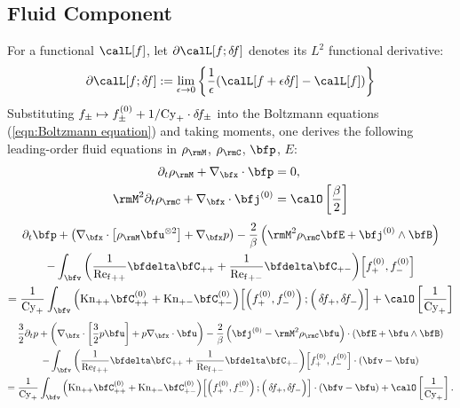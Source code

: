     \line

    \subsection*{Fluid Component}
        For a functional $\calL[f]$, let $\partial\calL[f; \delta\!f]$ denotes its $L^{2}$ functional derivative:
        \begin{equation}
            \partial\calL[f; \delta\!f]  :=  \lim_{\epsilon \rightarrow 0}\left\{\frac{1}{\epsilon}(\calL[f + \epsilon\delta\!f] - \calL[f])\right\}
        \end{equation}
        Substituting $f_{\pm}  \mapsto  f_{\pm}^{(0)} + 1/\mathrm{Cy}_{+}\cdot\delta\!f_{\pm}$ into the Boltzmann equations (\ref{eqn:Boltzmann equation}) and taking moments, one derives the following leading-order fluid equations in $\rho_{\rmM}$, $\rho_{\rmC}$, $\bfp$, $E$:
        \begin{align}
            \partial_{t}\rho_{\rmM} + \nabla_{\bfx}\cdot\bfp  &=  0,  \label{eqn:PiC-coupled mass conservation}  \\
            \rmM^{2}\partial_{t}\rho_{\rmC} + \nabla_{\bfx}\cdot\bfj^{(0)}  &=  \calO\left[\frac{\beta}{2}\right]  \label{eqn:PiC-coupled charge conservation}
        \end{align}
        \vspace{-20pt}
        \begin{multline}
            \partial_{t}\bfp + \left(\nabla_{\bfx}\cdot\left[\rho_{\rmM}\bfu^{\otimes 2}\right] + \nabla_{\bfx}p\right) - \frac{2}{\beta}\left(\rmM^{2}\rho_{\rmC}\bfE + \bfj^{(0)}\wedge\bfB\right) \\
            - \int_{\bfv}\left(\frac{1}{{\rmRef}_{++}}\bfdelta\bfC_{++} + \frac{1}{{\rmRef}_{+-}}\bfdelta\bfC_{+-}\right)\!\left[f_{+}^{(0)}, f_{-}^{(0)}\right]  \\
            =  \frac{1}{\rmCy_{+}}\int_{\bfv}\left(\rmKn_{++}\bfC_{++}^{(0)} + \rmKn_{+-}\bfC_{+-}^{(0)}\right)\!\left[\left(f_{+}^{(0)}, f_{-}^{(0)}\right); \left({\color{white} f_{+}^{(0)}}\!\!\!\!\!\!\!\!\!\delta\!f_{+}, \delta\!f_{-}\right)\right] + \calO\left[\frac{1}{\rmCy_{+}}\right]
        \end{multline}
        \vspace{-20pt}
        \begin{multline}\label{eqn:PiC-coupled pressure conservation}
            \frac{3}{2}\partial_{t}p + \left(\nabla_{\bfx}\cdot\left[\frac{3}{2}p\bfu\right] + p\nabla_{\bfx}\cdot\bfu\right) - \frac{2}{\beta}\left(\bfj^{(0)} - \rmM^{2}\rho_{\rmC}\bfu\right)\cdot(\bfE + \bfu\wedge\bfB)  \\
            - \int_{\bfv}\left(\frac{1}{{\rmRef}_{++}}\bfdelta\bfC_{++} + \frac{1}{{\rmRef}_{+-}}\bfdelta\bfC_{+-}\right)\!\left[f_{+}^{(0)}, f_{-}^{(0)}\right]\cdot(\bfv - \bfu)  \\
            =  \frac{1}{\rmCy_{+}}\int_{\bfv}\left(\rmKn_{++}\bfC_{++}^{(0)} + \rmKn_{+-}\bfC_{+-}^{(0)}\right)\!\left[\left(f_{+}^{(0)}, f_{-}^{(0)}\right); \left({\color{white} f_{+}^{(0)}}\!\!\!\!\!\!\!\!\!\delta\!f_{+}, \delta\!f_{-}\right)\right]\cdot(\bfv - \bfu) + \calO\left[\frac{1}{\rmCy_{+}}\right].
        \end{multline}
        
